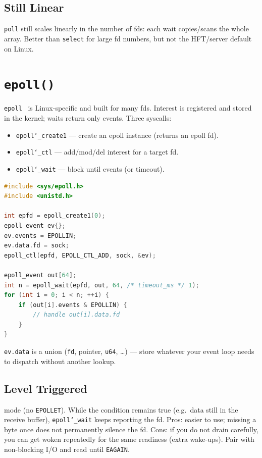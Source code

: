 \subsection{Still Linear}
\label{subsec:poll-still-linear}
\texttt{poll} still scales linearly in the number of fds: each wait copies/scans the whole 
array. Better than \texttt{select} for large fd numbers, but not the HFT/server default on Linux.

\section{\texttt{epoll()}}
\label{sec:epoll}
\texttt{epoll}~\cite{man-epoll} is Linux-specific and built for many fds. Interest is registered 
 and stored in the kernel; waits return only  events.
\newline
Three syscalls:
\begin{itemize}
    \item \texttt{epoll\char`_create1} --- create an epoll instance (returns an epoll fd).
    \item \texttt{epoll\char`_ctl} --- add/mod/del interest for a target fd.
    \item \texttt{epoll\char`_wait} --- block until events (or timeout).
\end{itemize}

\begin{lstlisting}[language=C++]
#include <sys/epoll.h>
#include <unistd.h>

int epfd = epoll_create1(0);
epoll_event ev{};
ev.events = EPOLLIN;
ev.data.fd = sock;
epoll_ctl(epfd, EPOLL_CTL_ADD, sock, &ev);

epoll_event out[64];
int n = epoll_wait(epfd, out, 64, /* timeout_ms */ 1);
for (int i = 0; i < n; ++i) {
    if (out[i].events & EPOLLIN) {
        // handle out[i].data.fd
    }
}
\end{lstlisting}
\texttt{ev.data} is a union (\texttt{fd}, pointer, \texttt{u64}, \ldots) --- store whatever your 
event loop needs to dispatch without another lookup.

\subsection{Level Triggered}
\label{subsec:epoll-level-triggered}
 mode (no \texttt{EPOLLET}). While the condition remains true 
(e.g.\ data still in the receive buffer), \texttt{epoll\char`_wait} keeps reporting the fd.
\newline
Pros: easier to use; missing a byte once does not permanently silence the fd. 
Cons: if you do not drain carefully, you can get woken repeatedly for the same readiness 
(extra wake-ups). Pair with non-blocking I/O and read until \texttt{EAGAIN}.

